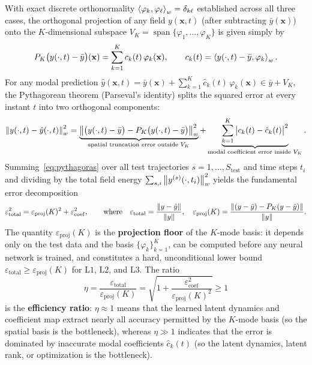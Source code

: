 With exact discrete orthonormality $\left\langle \varphi_k, \varphi_\ell \right\rangle_w = \delta_{k\ell}$ established across all three cases, the orthogonal projection of any field $y(\mathbf{x},t)$ (after subtracting $\bar{y}(\mathbf{x})$) onto the $K$-dimensional subspace $V_K = \operatorname{span}\{\varphi_1,\dots,\varphi_K\}$ is given simply by
\begin{equation}
  P_K\big(y(\cdot,t) - \bar{y}\big)(\mathbf{x}) = \sum_{k=1}^K c_k(t)\,\varphi_k(\mathbf{x}), \qquad c_k(t) = \left\langle y(\cdot,t) - \bar{y}, \varphi_k \right\rangle_w.
\end{equation}
For any modal prediction $\hat{y}(\mathbf{x},t) = \bar{y}(\mathbf{x}) + \sum_{k=1}^K \hat{c}_k(t)\,\varphi_k(\mathbf{x}) \in \bar{y} + V_K$, the Pythagorean theorem (Parseval's identity) splits the squared error at every instant $t$ into two orthogonal components:
\begin{equation}
  \left\lVert y(\cdot,t) - \hat{y}(\cdot,t) \right\rVert_w^2 = \underbrace{\left\lVert \big(y(\cdot,t) - \bar{y}\big) - P_K\big(y(\cdot,t) - \bar{y}\big) \right\rVert_w^2}_{\text{spatial truncation error outside } V_K} + \underbrace{\sum_{k=1}^K \big|c_k(t) - \hat{c}_k(t)\big|^2}_{\text{modal coefficient error inside } V_K}.
  \label{eq:pythagoras}
\end{equation}
Summing~\eqref{eq:pythagoras} over all test trajectories $s=1,\dots,S_{\mathrm{test}}$ and time steps $t_i$ and dividing by the total field energy $\sum_{s,i} \left\lVert y^{(s)}(\cdot,t_i) \right\rVert_w^2$ yields the fundamental error decomposition
\begin{equation}
  \varepsilon_{\mathrm{total}}^2 = \varepsilon_{\mathrm{proj}}(K)^2 + \varepsilon_{\mathrm{coef}}^2, \qquad
  \text{where}\quad
  \varepsilon_{\mathrm{total}} = \frac{\left\lVert y - \hat{y} \right\rVert}{\left\lVert y \right\rVert}, \quad
  \varepsilon_{\mathrm{proj}}(K) = \frac{\left\lVert (y - \bar{y}) - P_K(y - \bar{y}) \right\rVert}{\left\lVert y \right\rVert}.
  \label{eq:eps_decomp}
\end{equation}
The quantity $\varepsilon_{\mathrm{proj}}(K)$ is the \textbf{projection floor} of the $K$-mode basis: it depends only on the test data and the basis $\{\varphi_k\}_{k=1}^K$, can be computed before any neural network is trained, and constitutes a hard, unconditional lower bound $\varepsilon_{\mathrm{total}} \ge \varepsilon_{\mathrm{proj}}(K)$ for $\mathrm{L1}$, $\mathrm{L2}$, and $\mathrm{L3}$. The ratio
\begin{equation}
  \eta = \frac{\varepsilon_{\mathrm{total}}}{\varepsilon_{\mathrm{proj}}(K)} = \sqrt{1 + \frac{\varepsilon_{\mathrm{coef}}^2}{\varepsilon_{\mathrm{proj}}(K)^2}} \ge 1
  \label{eq:eff_ratio}
\end{equation}
is the \textbf{efficiency ratio}: $\eta \approx 1$ means that the learned latent dynamics and coefficient map extract nearly all accuracy permitted by the $K$-mode basis (so the spatial basis is the bottleneck), whereas $\eta \gg 1$ indicates that the error is dominated by inaccurate modal coefficients $\hat{c}_k(t)$ (so the latent dynamics, latent rank, or optimization is the bottleneck).

